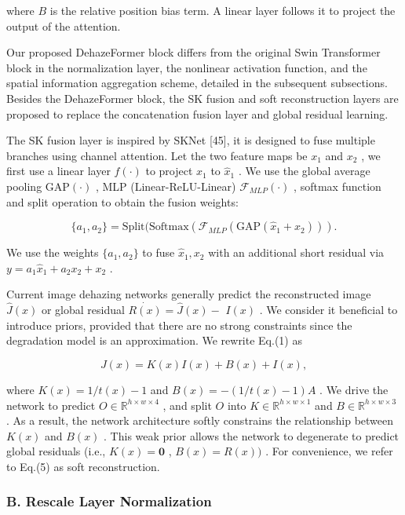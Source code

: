 where $B$ is the relative position bias term. A linear layer follows it to project the output of the attention.

Our proposed DehazeFormer block differs from the original Swin Transformer block in the normalization layer, the nonlinear activation function, and the spatial information aggregation scheme, detailed in the subsequent subsections. Besides the DehazeFormer block, the SK fusion and soft reconstruction layers are proposed to replace the concatenation fusion layer and global residual learning.

The SK fusion layer is inspired by SKNet [45], it is designed to fuse multiple branches using channel attention. Let the two feature maps be $x_{1}$ and $x_{2}$ , we first use a linear layer $f(\cdot)$ to project $x_{1}$ to $\hat{x}_{1}$ . We use the global average pooling $\mathrm{GAP(\cdot)}$ , MLP (Linear-ReLU-Linear) $\mathcal{F}_{M L P}(\cdot)$ , softmax function and split operation to obtain the fusion weights:

\begin{equation}
\{a_{1},a_{2}\}=\mathrm{Split}(\mathrm{Softmax}(\mathcal{F}_{M L P}(\mathrm{GAP}\left(\hat{x}_{1}+x_{2}\right))).
\end{equation}

We use the weights $\{a_{1},a_{2}\}$ to fuse $\hat{x}_{1},x_{2}$ with an additional short residual via $y=a_{1}\hat{x}_{1}+a_{2}x_{2}+x_{2}$ .

Current image dehazing networks generally predict the reconstructed image $\hat{J}(x)$ or global residual $\dot{R(x)}=\hat{J}(x)-$ $I(x)$ . We consider it beneficial to introduce priors, provided that there are no strong constraints since the degradation model is an approximation. We rewrite Eq.(1) as

\begin{equation}
J(x)=K(x)I(x)+B(x)+I(x),
\end{equation}

where $K(x)=1/t(x)-1$ and $B(x)=-\left(1/t(x)-1\right)A$ . We drive the network to predict $O\in\mathbb{R}^{h\times w\times4}$ , and split $O$ into $K\in\mathbb{R}^{h\times w\times1}$ and $B\in\mathbb{R}^{h\times w\times3}$ . As a result, the network architecture softly constrains the relationship between $K(x)$ and $B(x)$ . This weak prior allows the network to degenerate to predict global residuals (i.e., $K(x)=\mathbf{0}$ , $B(x)=R(x))$ . For convenience, we refer to Eq.(5) as soft reconstruction.

\subsubsection{B. Rescale Layer Normalization}

